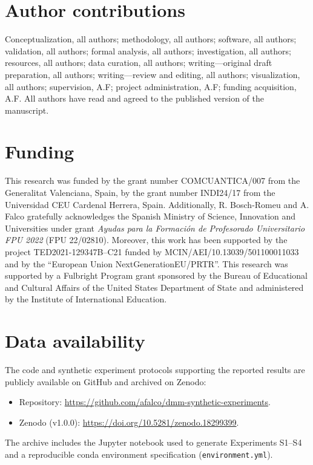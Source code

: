 \documentclass[preprint,11pt]{elsarticle}
\begin{document}
\section*{Author contributions}
Conceptualization, all authors; methodology, all authors; software, all authors; validation, all authors; formal analysis, all authors; investigation, all authors; resources, all authors; data curation, all authors; writing---original draft preparation, all authors; writing---review and editing, all authors; visualization, all authors; supervision, A.F; project administration, A.F; funding acquisition, A.F. All authors have read and agreed to the published version of the manuscript.

\section*{Funding}
    This research was funded by the grant number COMCUANTICA/007 from the Generalitat Valenciana, Spain, by the grant number INDI24/17 from the Universidad CEU Cardenal Herrera, Spain. Additionally, R. Bosch-Romeu and A. Falco gratefully acknowledges the Spanish Ministry of Science, Innovation and Universities under grant \textit{Ayudas para la Formación de Profesorado Universitario FPU 2022} (FPU 22/02810). Moreover, this work has been supported by the project TED2021-129347B–C21 funded by MCIN/AEI/10.13039/501100011033 and by the “European Union NextGenerationEU/PRTR”. This research was supported by a Fulbright Program grant sponsored by the Bureau of Educational and Cultural Affairs of the United States Department of State and administered by the Institute of International Education.

\section*{Data availability}
\label{data_availability}
The code and synthetic experiment protocols supporting the reported results are publicly available on GitHub and archived on Zenodo:
\begin{itemize}
    \item Repository: \url{https://github.com/afalco/dmm-synthetic-experiments}. 
    \item Zenodo (v1.0.0): \url{https://doi.org/10.5281/zenodo.18299399}. 
\end{itemize}
The archive includes the Jupyter notebook used to generate Experiments S1--S4 and a reproducible conda environment specification (\texttt{environment.yml}).
\end{document}
